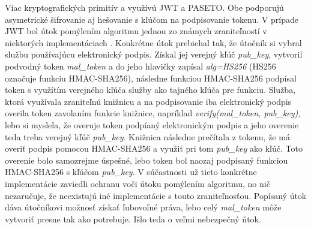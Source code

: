 Viac kryptografických primitív a využívú JWT a PASETO. Obe podporujú asymetrické šifrovanie aj hešovanie s kľúčom na podpisovanie tokenu. V prípade JWT bol útok pomýlením algoritmu jednou zo známych zraniteľností v niektorých implementáciach \cite{jwt_vul}. Konkrétne útok prebiehal tak, že útočník si vybral službu používajúcu elektronický podpis. Získal jej verejný kľúč \textit{pub\_key}, vytvoril podvodný token \textit{mal\_token} a do jeho hlavičky zapísal \textit{alg=HS256} (HS256 označuje funkciu HMAC-SHA256), následne funkciou HMAC-SHA256 podpísal token s využítím verejného kľúča služby ako tajného kľúča pre funkciu. Služba, ktorá využívala zraniteľnú knižnicu a na podpisovanie iba elektronický podpis overila token zavolaním funkcie knižnice, napríklad \textit{verify(mal\_token, pub\_key)}, lebo si myslela, že overuje token podpíaný elektronickým podpis a jeho overenie teda treba verejný kľúč \textit{pub\_key}. Knižnica následne prečítala z tokenu, že má overiť podpis pomocou HMAC-SHA256 a využiť pri tom \textit{pub\_key} ako kľúč. Toto overenie bolo samozrejme úspešné, lebo token bol naozaj podpísaný funkciou HMAC-SHA256 s kľúčom \textit{pub\_key}. V súčastnosti už tieto konkrétne implementácie zaviedli ochranu voči útoku pomýlením algoritmu, no nič nezaručuje, že neexistujú iné implementácie s touto zraniteľnosťou. Popísaný útok dáva útočníkovi možnosť získať ľubovoľné práva, lebo celý \textit{mal\_token} môže vytvoriť presne tak ako potrebuje. Išlo teda o veľmi nebezpečný útok.